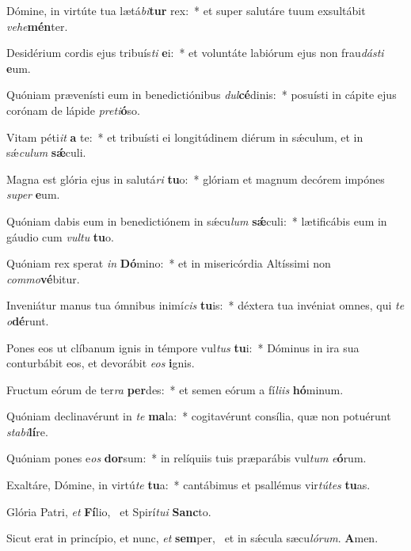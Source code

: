 \item Dómine, in virtúte tua lætá\textit{bi}\textbf{tur} rex:~* et super salutáre tuum exsultábit \textit{ve}\textit{he}\textbf{mén}ter.
\item Desidérium cordis ejus tribuís\textit{ti} \textbf{e}i:~* et voluntáte labiórum ejus non frau\textit{dás}\textit{ti} \textbf{e}um.
\item Quóniam prævenísti eum in benedictiónibus \textit{dul}\textbf{cé}dinis:~* posuísti in cápite ejus corónam de lápide \textit{pre}\textit{ti}\textbf{ó}so.
\item Vitam péti\textit{it} \textbf{a} te:~* et tribuísti ei longitúdinem diérum in sǽculum, et in sǽ\textit{cu}\textit{lum} \textbf{sǽ}culi.
\item Magna est glória ejus in salutá\textit{ri} \textbf{tu}o:~* glóriam et magnum decórem impónes \textit{su}\textit{per} \textbf{e}um.
\item Quóniam dabis eum in benedictiónem in sǽcu\textit{lum} \textbf{sǽ}culi:~* lætificábis eum in gáudio cum \textit{vul}\textit{tu} \textbf{tu}o.
\item Quóniam rex sperat \textit{in} \textbf{Dó}mino:~* et in misericórdia Altíssimi non \textit{com}\textit{mo}\textbf{vé}bitur.
\item Inveniátur manus tua ómnibus inimí\textit{cis} \textbf{tu}is:~* déxtera tua invéniat omnes, qui \textit{te} \textit{o}\textbf{dé}runt.
\item Pones eos ut clíbanum ignis in témpore vul\textit{tus} \textbf{tu}i:~* Dóminus in ira sua conturbábit eos, et devorábit \textit{e}\textit{os} \textbf{i}gnis.
\item Fructum eórum de ter\textit{ra} \textbf{per}des:~* et semen eórum a fí\textit{li}\textit{is} \textbf{hó}minum.
\item Quóniam declinavérunt in \textit{te} \textbf{ma}la:~* cogitavérunt consília, quæ non potuérunt \textit{sta}\textit{bi}\textbf{lí}re.
\item Quóniam pones e\textit{os} \textbf{dor}sum:~* in relíquiis tuis præparábis vul\textit{tum} \textit{e}\textbf{ó}rum.
\item Exaltáre, Dómine, in virtú\textit{te} \textbf{tu}a:~* cantábimus et psallémus vir\textit{tú}\textit{tes} \textbf{tu}as.
\item Glória Patri, \textit{et} \textbf{Fí}lio,~\psstar{} et Spirí\textit{tu}\textit{i} \textbf{Sanc}to.
\item Sicut erat in princípio, et nunc, \textit{et} \textbf{sem}per,~\psstar{} et in sǽcula sæcu\textit{ló}\textit{rum}. \textbf{A}men.